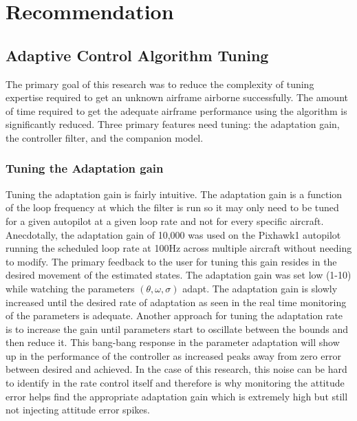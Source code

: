 \chapter{Recommendation}

\section{\Lone Adaptive Control Algorithm Tuning}\label{sec:tuning}
The primary goal of this research was to reduce the complexity of tuning expertise required to get an unknown airframe airborne successfully.  The amount of time required to get the adequate airframe performance using the \Lone algorithm is significantly reduced.  Three primary features need tuning: the adaptation gain, the controller filter, and the companion model.

\subsection{Tuning the Adaptation gain}
Tuning the adaptation gain is fairly intuitive.  The adaptation gain is a function of the loop frequency at which the filter is run so it may only need to be tuned for a given autopilot at a given loop rate and not for every specific aircraft.  Anecdotally, the adaptation gain of 10,000 was used on the Pixhawk1 autopilot running the scheduled loop rate at 100Hz across multiple aircraft without needing to modify.  The primary feedback to the user for tuning this gain resides in the desired movement of the estimated states.  The adaptation gain was set low (1-10) while watching the parameters $(\theta, \omega, \sigma)$ adapt.  The adaptation gain is slowly increased until the desired rate of adaptation as seen in the real time monitoring of the parameters is adequate.  Another approach for tuning the adaptation rate is to increase the gain until parameters start to oscillate between the bounds and then reduce it.  This bang-bang response in the parameter adaptation will show up in the performance of the controller as increased peaks away from zero error between desired and achieved.  In the case of this research, this noise can be hard to identify in the rate control itself and therefore is why monitoring the attitude error helps find the appropriate adaptation gain which is extremely high but still not injecting attitude error spikes.

